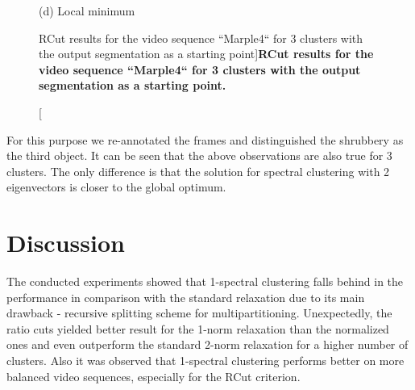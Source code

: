 \begin{figure}[htbp]
\begin{minipage}[t]{0.5\linewidth}
\begin{minipage}[t]{1\textwidth}
\centering
\hfill \hfill   \hfill 
{} 
\hfill 
{} 
\hfill 
{} 
\hfill 
{} 

\footnotesize (d) Local minimum
\end{minipage}

\end{minipage}
\caption[RCut results for the video sequence ``Marple4`` for 3 clusters with the output segmentation as a starting point]{
{\bf RCut results for the video sequence ``Marple4`` for 3 clusters with the output segmentation as a starting point.}}
\label{fig:RCut_3}
\end{figure}

For this purpose we re-annotated the frames and distinguished the shrubbery as the third object.
It can be seen that the above observations are also true for 3 clusters. The only difference is that the solution for spectral clustering with 2 eigenvectors 
is closer to the global optimum.
\section{Discussion}
\label{ch4:disc}
The conducted experiments showed that 1-spectral clustering falls behind in the performance in comparison with the standard relaxation due to its main drawback - recursive splitting scheme for multipartitioning.
Unexpectedly, the ratio cuts yielded better result for the 1-norm relaxation than the normalized ones and even outperform the standard 2-norm relaxation for a higher number of clusters. Also it was observed that
1-spectral clustering performs better on more balanced video sequences, especially for the RCut criterion.

